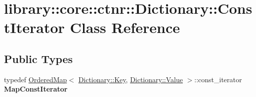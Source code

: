 \hypertarget{classlibrary_1_1core_1_1ctnr_1_1_dictionary_1_1_const_iterator}{}\section{library\+:\+:core\+:\+:ctnr\+:\+:Dictionary\+:\+:Const\+Iterator Class Reference}
\label{classlibrary_1_1core_1_1ctnr_1_1_dictionary_1_1_const_iterator}
\subsection*{Public Types}
\begin{DoxyCompactItemize}
\item 
\mbox{\label{classlibrary_1_1core_1_1ctnr_1_1_dictionary_1_1_const_iterator_a34426ebde79ee2bb93040f498f09b9ca}} 
typedef \hyperlink{_ordered_map_8hpp_a1c0809231c3bc9fccce602bd7941a36b}{Ordered\+Map}$<$ \hyperlink{classlibrary_1_1core_1_1types_1_1_string}{Dictionary\+::\+Key}, \hyperlink{classlibrary_1_1core_1_1ctnr_1_1_object}{Dictionary\+::\+Value} $>$\+::const\+\_\+iterator {\bfseries Map\+Const\+Iterator}
\end{DoxyCompactItemize}
